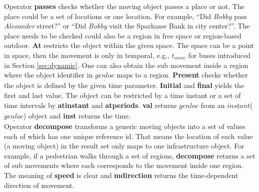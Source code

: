 Operator \textbf{passes} checks whether the moving object
passes a place or not. The place could be a set of locations or one location. For example, ``Did \textit{Bobby} pass \textit{Alexander} street?'' or ``Did \textit{Bobby} visit the Sparkasse Bank in city center?''. The place needs to be checked could also be a region in free space or region-based outdoor. \textbf{At} restricts the object within the given space. The space can be a point in space, then the movement is only in temporal, e.g., $t_{move}$ for buses introduced in Section \ref{sec:dynamic}. One can also obtain the sub movement inside a region where the object identifier in $\underline{genloc}$ maps to a region. 
\textbf{Present} checks whether the object is defined by the given time parameter. 
\textbf{Initial} and \textbf{final} yields the first and last value. The object can be restricted by
a time instant or a set of time intervals by \textbf{atinstant} and \textbf{atperiods}. \textbf{val} returns $\underline{genloc}$ from an $\underline{instant}$($\underline{genloc}$) object and \textbf{inst} returns the time. \\


Operator \textbf{decompose} transforms a generic moving objects into a set of values each of which has  one unique reference id. That means the location of each value (a moving object) in the result set  only maps to one infrastructure object. For example, if a pedestrian walks through a set of regions, \textbf{decompose} returns a set of sub movements where each corresponds to the movement inside one region.  The meaning of \textbf{speed} is clear and \textbf{mdirection} returns the time-dependent direction of movement.  

